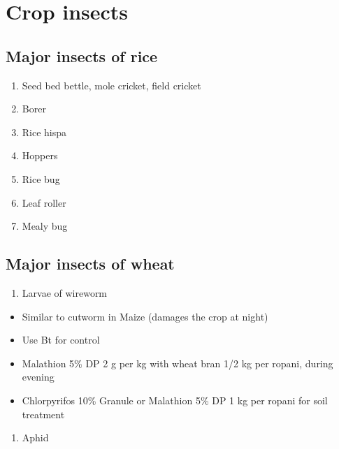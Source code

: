 \documentclass[
  openany]{book}
\providecommand{\tightlist}{%
  \setlength{\itemsep}{0pt}\setlength{\parskip}{0pt}}
\begin{document}
\hypertarget{crop-insects}{%
\section{Crop insects}\label{crop-insects}}

\hypertarget{major-insects-of-rice}{%
\subsection{Major insects of rice}\label{major-insects-of-rice}}

\begin{enumerate}
\def\labelenumi{\arabic{enumi}.}
\tightlist
\item
  Seed bed bettle, mole cricket, field cricket
\item
  Borer
\item
  Rice hispa
\item
  Hoppers
\item
  Rice bug
\item
  Leaf roller
\item
  Mealy bug
\end{enumerate}

\hypertarget{major-insects-of-wheat}{%
\subsection{Major insects of wheat}\label{major-insects-of-wheat}}

\begin{enumerate}
\def\labelenumi{\arabic{enumi}.}
\tightlist
\item
  Larvae of wireworm
\end{enumerate}

\begin{itemize}
\tightlist
\item
  Similar to cutworm in Maize (damages the crop at night)
\item
  Use Bt for control
\item
  Malathion 5\% DP 2 g per kg with wheat bran 1/2 kg per ropani, during evening
\item
  Chlorpyrifos 10\% Granule or Malathion 5\% DP 1 kg per ropani for soil treatment
\end{itemize}

\begin{enumerate}
\def\labelenumi{\arabic{enumi}.}
\setcounter{enumi}{1}
\tightlist
\item
  Aphid
\end{enumerate}
\end{document}
